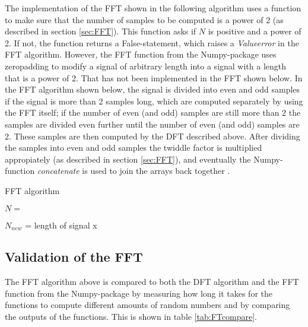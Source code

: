 The implementation of the FFT shown in the following algorithm uses a function to make sure that the number of samples to be computed is a power of 2 (as described in section \ref{sec:FFT}). This function asks if $N$ is positive and a power of 2. If not, the function returns a False-statement, which raises a \textit{Valueerror} in the FFT algorithm. However, the FFT function from the Numpy-package uses zeropadding to modify a signal of arbitrary length into a signal with a length that is a power of 2. That has not been implemented in the FFT shown below. In the FFT algorithm shown below, the signal is divided into even and odd samples if the signal is more than 2 samples long, which are computed separately by using the FFT itself; if the number of even (and odd) samples are still more than 2 the samples are divided even further until the number of even (and odd) samples are 2. These samples are then computed by the DFT described above. After dividing the samples into even and odd samples the twiddle factor is multiplied appropiately (as described in section \ref{sec:FFT}), and eventually the Numpy-function \textit{concatenate} is used to join the arrays back together .
\begin{algorithm}
\caption{FFT algorithm}
\label{FFTalg}
\begin{algorithmic}[1]
\State $N = $ 
\EndProcedure

	\State $N_{new}$ = length of signal x
	\Else
		 
		 
		 
	\EndIf
\EndProcedure
\end{algorithmic}
\end{algorithm}

\subsection{Validation of the FFT}
The FFT algorithm above is compared to both the DFT algorithm and the FFT function from the Numpy-package by measuring how long it takes for the functions to compute different amounts of random numbers and by comparing the outputs of the functions. This is shown in table \ref{tab:FTcompare}.

